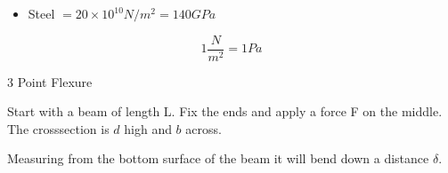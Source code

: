\documentclass{report}
\begin{document}
\begin{description}
\begin{mdframed}
            \begin{itemize}
                \item Steel $= 20\times 10^{10} N/m^2
                    = 140 GPa$
            \end{itemize}

            \begin{displaymath}
                1 \frac{N}{m^2} = 1Pa
            \end{displaymath}
            
        \end{mdframed}
    \item {\large 3 Point Flexure}
        \begin{mdframed}
            \begin{center}
            \end{center}
            
            Start with a beam of length L.
            Fix the ends and apply a force F on
            the middle. The crosssection is $d$ high
            and  $b$ across.

            Measuring from the bottom surface of the beam
            it will bend down a distance $\delta$.


\end{mdframed}
\end{description}
\end{document}

